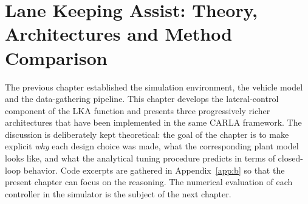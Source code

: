 %

\chapter{Lane Keeping Assist: Theory, Architectures and Method Comparison}
\label{ch3}

The previous chapter established the simulation environment, the vehicle model and the data-gathering pipeline. This chapter develops the lateral-control component of the \ac{LKA} function and presents three progressively richer architectures that have been implemented in the same CARLA framework. The discussion is deliberately kept theoretical: the goal of the chapter is to make explicit \emph{why} each design choice was made, what the corresponding plant model looks like, and what the analytical tuning procedure predicts in terms of closed-loop behavior. Code excerpts are gathered in Appendix~\ref{app:b} so that the present chapter can focus on the reasoning. The numerical evaluation of each controller in the simulator is the subject of the next chapter.

